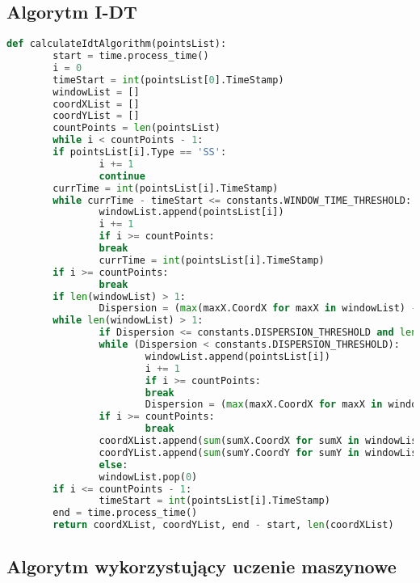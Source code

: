 \subsection{Algorytm I-DT}
\begin{lstlisting}[language=Python, caption=Kod algorytmu I-DT, label={lst:idt}]
def calculateIdtAlgorithm(pointsList):
        start = time.process_time()
        i = 0
        timeStart = int(pointsList[0].TimeStamp)
        windowList = []
        coordXList = []
        coordYList = []
        countPoints = len(pointsList)
        while i < countPoints - 1:
        if pointsList[i].Type == 'SS':
                i += 1
                continue
        currTime = int(pointsList[i].TimeStamp)
        while currTime - timeStart <= constants.WINDOW_TIME_THRESHOLD:
                windowList.append(pointsList[i])
                i += 1
                if i >= countPoints:
                break
                currTime = int(pointsList[i].TimeStamp)
        if i >= countPoints:
                break
        if len(windowList) > 1:
                Dispersion = (max(maxX.CoordX for maxX in windowList) - min(minX.CoordX for minX in windowList)) + (max(maxY.CoordY for maxY in windowList) - min(minY.CoordY for minY in windowList))
        while len(windowList) > 1:
                if Dispersion <= constants.DISPERSION_THRESHOLD and len(windowList) > 1:
                while (Dispersion < constants.DISPERSION_THRESHOLD):
                        windowList.append(pointsList[i])
                        i += 1
                        if i >= countPoints:
                        break
                        Dispersion = (max(maxX.CoordX for maxX in windowList) - min(minX.CoordX for minX in windowList)) + (max(maxY.CoordY for maxY in windowList) - min(minY.CoordY for minY in windowList))
                if i >= countPoints:
                        break
                coordXList.append(sum(sumX.CoordX for sumX in windowList) / len(windowList))
                coordYList.append(sum(sumY.CoordY for sumY in windowList) / len(windowList))
                else:
                windowList.pop(0)
        if i <= countPoints - 1:
                timeStart = int(pointsList[i].TimeStamp)
        end = time.process_time()
        return coordXList, coordYList, end - start, len(coordXList)
\end{lstlisting}
\subsection{Algorytm wykorzystujący uczenie maszynowe}
\label{ssec:machinelearningalg}

